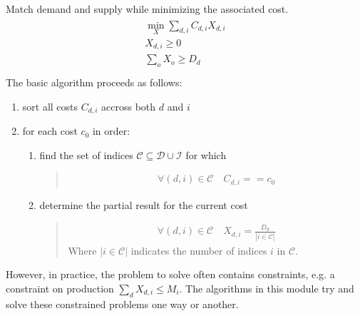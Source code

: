 \documentclass[letterpaper,10pt,english]{sphinxmanual}
\begin{document}
Match demand and supply while minimizing the associated cost.
\begin{align*}\!\begin{aligned}
\min_{X} \sum_{d, i} C_{d,i} X_{d, i}\\
X_{d, i} \geq 0\\
\sum_o X_o \geq D_d\\
\end{aligned}\end{align*}
The basic algorithm proceeds as follows:
\begin{enumerate}
%
\item {} 
sort all costs \(C_{d, i}\) accross both \(d\) and \(i\)

\item {} 
for each cost \(c_0\) in order:
\begin{enumerate}
%
\item {} 
find the set of indices \(\mathcal{C}\subseteq\mathcal{D}\cup\mathcal{I}\)
for which
\begin{quote}
\begin{equation*}
\begin{split}\forall (d, i) \in \mathcal{C}\quad C_{d, i} == c_0\end{split}
\end{equation*}\end{quote}

\item {} 
determine the partial result for the current cost
\begin{quote}
\begin{equation*}
\begin{split}\forall (d, i) \in \mathcal{C}\quad X_{d, i} = \frac{D_d}{|i\in\mathcal{C}|}\end{split}
\end{equation*}
Where \(|i\in\mathcal{C}|\) indicates the number of indices \(i\) in
\(\mathcal{C}\).
\end{quote}

\end{enumerate}

\end{enumerate}

However, in practice, the problem to solve often contains constraints, e.g. a constraint
on production \(\sum_d X_{d, i} \leq M_i\). The algorithms in this module try and
solve these constrained problems one way or another.
\end{document}
